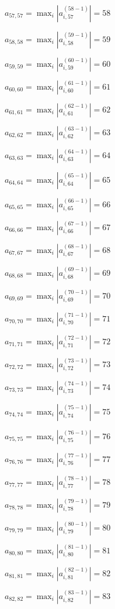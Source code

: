 \documentclass[a4paper,12pt]{article}
\begin{document}
$a _{ 57, 57 } =  \max _i |a _{ i, 57 } ^{ (58 - 1) } | = 58$

$a _{ 58, 58 } =  \max _i |a _{ i, 58 } ^{ (59 - 1) } | = 59$

$a _{ 59, 59 } =  \max _i |a _{ i, 59 } ^{ (60 - 1) } | = 60$

$a _{ 60, 60 } =  \max _i |a _{ i, 60 } ^{ (61 - 1) } | = 61$

$a _{ 61, 61 } =  \max _i |a _{ i, 61 } ^{ (62 - 1) } | = 62$

$a _{ 62, 62 } =  \max _i |a _{ i, 62 } ^{ (63 - 1) } | = 63$

$a _{ 63, 63 } =  \max _i |a _{ i, 63 } ^{ (64 - 1) } | = 64$

$a _{ 64, 64 } =  \max _i |a _{ i, 64 } ^{ (65 - 1) } | = 65$

$a _{ 65, 65 } =  \max _i |a _{ i, 65 } ^{ (66 - 1) } | = 66$

$a _{ 66, 66 } =  \max _i |a _{ i, 66 } ^{ (67 - 1) } | = 67$

$a _{ 67, 67 } =  \max _i |a _{ i, 67 } ^{ (68 - 1) } | = 68$

$a _{ 68, 68 } =  \max _i |a _{ i, 68 } ^{ (69 - 1) } | = 69$

$a _{ 69, 69 } =  \max _i |a _{ i, 69 } ^{ (70 - 1) } | = 70$

$a _{ 70, 70 } =  \max _i |a _{ i, 70 } ^{ (71 - 1) } | = 71$

$a _{ 71, 71 } =  \max _i |a _{ i, 71 } ^{ (72 - 1) } | = 72$

$a _{ 72, 72 } =  \max _i |a _{ i, 72 } ^{ (73 - 1) } | = 73$

$a _{ 73, 73 } =  \max _i |a _{ i, 73 } ^{ (74 - 1) } | = 74$

$a _{ 74, 74 } =  \max _i |a _{ i, 74 } ^{ (75 - 1) } | = 75$

$a _{ 75, 75 } =  \max _i |a _{ i, 75 } ^{ (76 - 1) } | = 76$

$a _{ 76, 76 } =  \max _i |a _{ i, 76 } ^{ (77 - 1) } | = 77$

$a _{ 77, 77 } =  \max _i |a _{ i, 77 } ^{ (78 - 1) } | = 78$

$a _{ 78, 78 } =  \max _i |a _{ i, 78 } ^{ (79 - 1) } | = 79$

$a _{ 79, 79 } =  \max _i |a _{ i, 79 } ^{ (80 - 1) } | = 80$

$a _{ 80, 80 } =  \max _i |a _{ i, 80 } ^{ (81 - 1) } | = 81$

$a _{ 81, 81 } =  \max _i |a _{ i, 81 } ^{ (82 - 1) } | = 82$

$a _{ 82, 82 } =  \max _i |a _{ i, 82 } ^{ (83 - 1) } | = 83$
\end{document}
